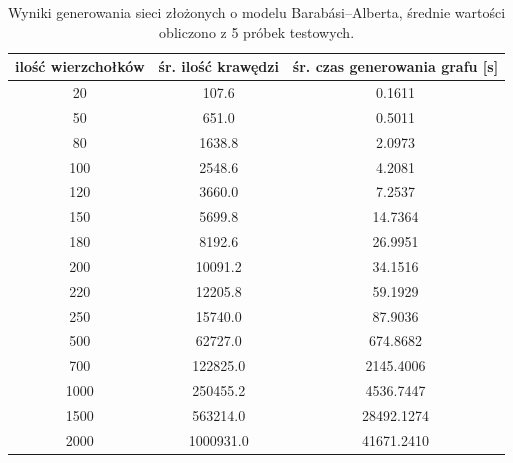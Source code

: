\documentclass[a4paper, 12pt, twoside, openright]{article}
\begin{document}
\begin{table}[h]
	\centering
	\caption{Wyniki generowania sieci złożonych o modelu Barabási–Alberta, średnie wartości obliczono z 5 próbek testowych.}
	\resizebox{16cm}{!}
	{
		\begin{tabular}{|c c c|}
			\hline
			ilość wierzchołków	& śr. ilość krawędzi 		& śr. czas generowania grafu [s]\\ \hline \hline
			20 	& 107.6 		& 0.1611 	\\ \hline
			50 	& 651.0 		& 0.5011 	\\ \hline
			80 	& 1638.8        & 2.0973	\\ \hline
			100 & 2548.6        & 4.2081	\\ \hline
			120 & 3660.0        & 7.2537	\\ \hline
			150 & 5699.8   		& 14.7364	\\ \hline
			180 & 8192.6        & 26.9951	\\ \hline
			200 & 10091.2 		& 34.1516	\\ \hline
			220 & 12205.8 		& 59.1929	\\ \hline
			250 & 15740.0 		& 87.9036	\\ \hline
			500 & 62727.0 		& 674.8682	\\ \hline				
			700 & 122825.0      & 2145.4006	\\ \hline
			1000& 250455.2	    & 4536.7447 \\ \hline
			1500& 563214.0	    & 28492.1274\\ \hline
			2000& 1000931.0    	& 41671.2410\\ \hline
		\end{tabular} 
	}
	\label{Tab:gen_BA}
\end{table}
\end{document}
